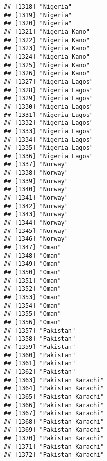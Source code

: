 \documentclass[]{article}
\begin{document}
\begin{verbatim}
## [1318] "Nigeria"                            
## [1319] "Nigeria"                            
## [1320] "Nigeria"                            
## [1321] "Nigeria Kano"                       
## [1322] "Nigeria Kano"                       
## [1323] "Nigeria Kano"                       
## [1324] "Nigeria Kano"                       
## [1325] "Nigeria Kano"                       
## [1326] "Nigeria Kano"                       
## [1327] "Nigeria Lagos"                      
## [1328] "Nigeria Lagos"                      
## [1329] "Nigeria Lagos"                      
## [1330] "Nigeria Lagos"                      
## [1331] "Nigeria Lagos"                      
## [1332] "Nigeria Lagos"                      
## [1333] "Nigeria Lagos"                      
## [1334] "Nigeria Lagos"                      
## [1335] "Nigeria Lagos"                      
## [1336] "Nigeria Lagos"                      
## [1337] "Norway"                             
## [1338] "Norway"                             
## [1339] "Norway"                             
## [1340] "Norway"                             
## [1341] "Norway"                             
## [1342] "Norway"                             
## [1343] "Norway"                             
## [1344] "Norway"                             
## [1345] "Norway"                             
## [1346] "Norway"                             
## [1347] "Oman"                               
## [1348] "Oman"                               
## [1349] "Oman"                               
## [1350] "Oman"                               
## [1351] "Oman"                               
## [1352] "Oman"                               
## [1353] "Oman"                               
## [1354] "Oman"                               
## [1355] "Oman"                               
## [1356] "Oman"                               
## [1357] "Pakistan"                           
## [1358] "Pakistan"                           
## [1359] "Pakistan"                           
## [1360] "Pakistan"                           
## [1361] "Pakistan"                           
## [1362] "Pakistan"                           
## [1363] "Pakistan Karachi"                   
## [1364] "Pakistan Karachi"                   
## [1365] "Pakistan Karachi"                   
## [1366] "Pakistan Karachi"                   
## [1367] "Pakistan Karachi"                   
## [1368] "Pakistan Karachi"                   
## [1369] "Pakistan Karachi"                   
## [1370] "Pakistan Karachi"                   
## [1371] "Pakistan Karachi"                   
## [1372] "Pakistan Karachi"                   

\end{verbatim}
\end{document}
